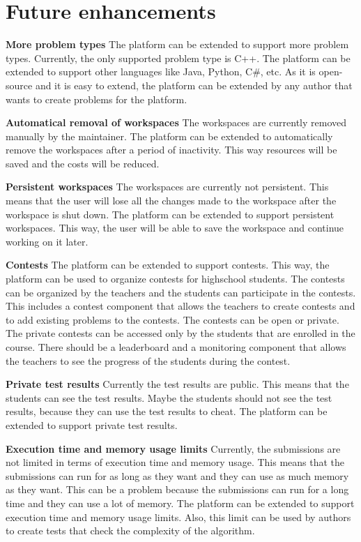 \documentclass[12pt,a4paper]{report}
\begin{document}
\section{Future enhancements}
\textbf{More problem types}
The platform can be extended to support more problem types. Currently, the only supported problem type is C++. The platform can be extended to support other languages like Java, Python, C\#, etc. As it is open-source and it is easy to extend, the platform can be extended by any author that wants to create problems for the platform.

\textbf{Automatical removal of workspaces}
The workspaces are currently removed manually by the maintainer. The platform can be extended to automatically remove the workspaces after a period of inactivity. This way resources will be saved and the costs will be reduced.

\textbf{Persistent workspaces}
The workspaces are currently not persistent. This means that the user will lose all the changes made to the workspace after the workspace is shut down. The platform can be extended to support persistent workspaces. This way, the user will be able to save the workspace and continue working on it later.

\textbf{Contests}
The platform can be extended to support contests. This way, the platform can be used to organize contests for highschool students. The contests can be organized by the teachers and the students can participate in the contests. This includes a contest component that allows the teachers to create contests and to add existing problems to the contests. The contests can be open or private. The private contests can be accessed only by the students that are enrolled in the course. There should be a leaderboard and a monitoring component that allows the teachers to see the progress of the students during the contest.

\textbf{Private test results}
Currently the test results are public. This means that the students can see the test results. Maybe the students should not see the test results, because they can use the test results to cheat. The platform can be extended to support private test results.

\textbf{Execution time and memory usage limits}
Currently, the submissions are not limited in terms of execution time and memory usage. This means that the submissions can run for as long as they want and they can use as much memory as they want. This can be a problem because the submissions can run for a long time and they can use a lot of memory. The platform can be extended to support execution time and memory usage limits. Also, this limit can be used by authors to create tests that check the complexity of the algorithm.
\end{document}
